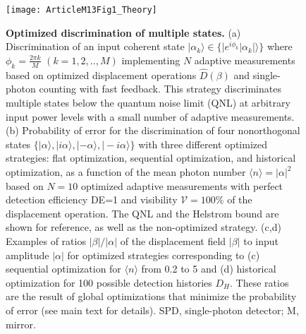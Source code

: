 \documentclass[twocolumn,pra,preprintnumbers,amsmath,amssymb,superscriptaddress,floatfix]{revtex4}%
\begin{document}
\begin{figure}[htbp]
\centering\texttt{[image: ArticleM13Fig1\_Theory]}
\caption{\label{TheoryFig1} \textbf{Optimized discrimination of
multiple states.} (a) Discrimination of an input coherent state
$|\alpha_{k}\rangle\in\{|e^{i\phi_{k}}|\alpha_{k}|\rangle\}$ where
$\phi_{k}=\frac{2\pi k}{M}$ $(k=1,2,..,M)$ implementing $N$ adaptive
measurements based on optimized displacement operations
$\hat{D}(\beta)$ and single-photon counting with fast feedback. This
strategy discriminates multiple states below the quantum noise limit
(QNL) at arbitrary input power levels with a small number of
adaptive measurements. (b) Probability of error for the
discrimination of four nonorthogonal states $\{|\alpha\rangle,
|i\alpha\rangle,|-\alpha\rangle,|-i\alpha\rangle\}$ with three
different optimized strategies: flat optimization, sequential
optimization, and historical optimization, as a function of the mean
photon number $\langle n\rangle=|\alpha|^2$ based on $N=10$
optimized adaptive measurements with perfect detection efficiency
DE=1 and visibility $\mathcal{V}=100\%$ of the displacement
operation. The QNL and the Helstrom bound are shown for reference,
as well as the non-optimized strategy. (c,d) Examples of ratios
$|\beta|/|\alpha|$ of the displacement field $|\beta|$ to input
amplitude $|\alpha|$ for optimized strategies corresponding to (c)
sequential optimization for $\langle n\rangle$ from 0.2 to 5 and
(d) historical optimization for 100 possible detection histories $D_{H}$. These
ratios are the result of global optimizations that minimize the
probability of error (see main text for details). SPD, single-photon
detector; M, mirror.}
\end{figure}
\normalsize
\end{document}
